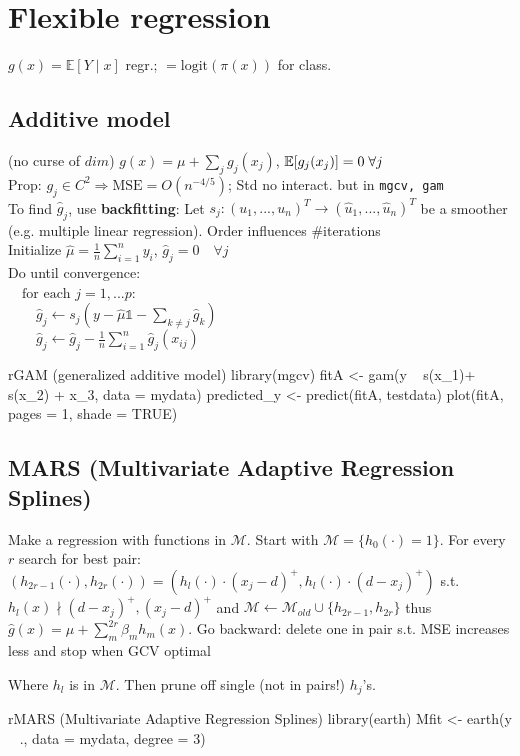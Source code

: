 \section*{Flexible regression}$g(x)=\mathbb{E}[Y\mid x]$ regr.;
$=\text{logit}(\pi(x))$ for class.

\subsection*{Additive model} (no curse of $dim$)
$g(x)=\mu +\sum_jg_j(x_j)$, $\mathbb{E}[g_j(x_j)]=0\; \forall j$\\
Prop: $g_j\in C^2\Rightarrow \text{MSE}=O(n^{-4/5})$; Std no interact. but in \texttt{mgcv, gam}\\
To find $\hat g_j$, use \textbf{backfitting}:
Let $s_j: (u_1,...,u_n)^T \to (\hat u_1,...,\hat u_n)^T$ be a smoother (e.g. multiple linear regression). Order influences \#iterations\\
Initialize $\hat \mu = \frac 1 n \sum_{i=1}^n y_i$, \quad $\hat g_j = 0 \quad \forall j$\\
Do until convergence:\\
$\quad \text{for each } j=1,...p$:\\
$\quad \quad \hat g_j \gets s_j(y - \hat \mu \mathbb{1} - \sum_{k \neq j} \hat g_k)$\\
$\quad \quad \hat g_j \gets \hat g_j - \frac 1 n \sum_{i=1}^n \hat g_j(x_{ij}) $\\
\begin{codebox}{r}{GAM (generalized additive model)}
library(mgcv)
fitA <- gam(y ~ s(x_1)+ s(x_2) + x_3, data = mydata)
predicted_y <- predict(fitA, testdata)
plot(fitA, pages = 1, shade = TRUE)
\end{codebox}

\subsection*{MARS (Multivariate Adaptive Regression Splines)}
Make a regression with functions in $\mathcal{M}$. Start with $\mathcal{M}=\{h_0(\cdot)=1\}$. For every $r$ search for best pair: $(h_{2r-1}(\cdot),h_{2r}(\cdot))=(h_l(\cdot)\cdot(x_j-d)^+,h_l(\cdot)\cdot(d-x_j)^+)$ s.t.
$h_l(x)\nmid(d-x_j)^+,(x_j-d)^+$ and $\mathcal{M}\leftarrow \mathcal{M}_{old}\cup\{h_{2r-1},h_{2r}\}$ thus $\hat g(x)=\mu + \sum^{2r}_m \beta_m h_m(x)$.
Go backward: delete one in pair s.t. MSE increases less and stop when GCV optimal


Where $h_l$ is in $\mathcal{M}$. Then prune off single (not in pairs!) $h_j$'s.
\begin{codebox}{r}{MARS (Multivariate Adaptive Regression Splines)}
library(earth)
Mfit <- earth(y ~ ., data = mydata, degree = 3)
\end{codebox}

